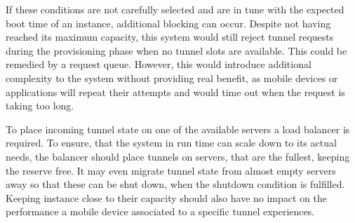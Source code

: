 If these conditions are not carefully selected and are in tune with the expected boot time of an instance, additional blocking can occur.
Despite not having reached its maximum capacity, this system would still reject tunnel requests during the provisioning phase when no tunnel slots are available.
This could be remedied by a request queue.
However, this would introduce additional complexity to the system without providing real benefit, as mobile devices or applications will repeat their attempts and would time out when the request is taking too long. 

To place incoming tunnel state on one of the available servers a load balancer is required. 
To ensure, that the system in run time can scale down to its actual needs, the balancer should place tunnels on servers, that are the fullest, keeping the reserve free.
It may even migrate tunnel state from almost empty servers away so that these can be shut down, when the shutdown condition is fulfilled.
Keeping instance close to their capacity should also have no impact on the performance a mobile device associated to a specific tunnel experiences.
